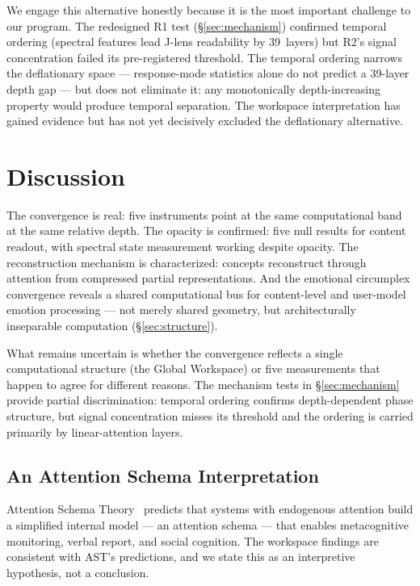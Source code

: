 \documentclass[11pt,a4paper]{article}
\begin{document}
We engage this alternative honestly because it is the most important
challenge to our program. The redesigned R1 test
(\S\ref{sec:mechanism}) confirmed temporal ordering (spectral
features lead J-lens readability by 39~layers) but R2's signal
concentration failed its pre-registered threshold. The temporal
ordering narrows the deflationary space --- response-mode statistics
alone do not predict a 39-layer depth gap --- but does not eliminate
it: any monotonically depth-increasing property would produce
temporal separation. The workspace interpretation has gained evidence
but has not yet decisively excluded the deflationary alternative.

\section{Discussion}
\label{sec:discussion}

The convergence is real: five instruments point at the same
computational band at the same relative depth. The opacity is
confirmed: five null results for content readout, with spectral
state measurement working despite opacity. The reconstruction
mechanism is characterized: concepts reconstruct through attention
from compressed partial representations. And the emotional
circumplex convergence reveals a shared computational bus for
content-level and user-model emotion processing --- not merely
shared geometry, but architecturally inseparable computation
(\S\ref{sec:structure}).

What remains uncertain is whether the convergence reflects a single
computational structure (the Global Workspace) or five measurements
that happen to agree for different reasons. The mechanism tests in
\S\ref{sec:mechanism} provide partial discrimination: temporal
ordering confirms depth-dependent phase structure, but signal
concentration misses its threshold and the ordering is carried
primarily by linear-attention layers.

\subsection{An Attention Schema Interpretation}

Attention Schema Theory~\citep{graziano2015attention}
predicts that systems with endogenous attention build a simplified
internal model --- an attention schema --- that enables metacognitive
monitoring, verbal report, and social cognition. The workspace
findings are consistent with AST's predictions, and we state this as
an interpretive hypothesis, not a conclusion.
\end{document}
